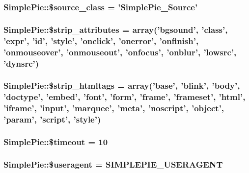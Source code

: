 \hypertarget{class_simple_pie_a8c05b90566d16d335054ed292cbe1de2}{
\subsubsection[{\$source\-\_\-class}]{\setlength{\rightskip}{0pt plus 5cm}Simple\-Pie\-::\$source\-\_\-class = '{\bf Simple\-Pie\-\_\-\-Source}'}}\label{class_simple_pie_a8c05b90566d16d335054ed292cbe1de2}
\hypertarget{class_simple_pie_af9901feeacfb99c20f9350a5d06a618f}{
\subsubsection[{\$strip\-\_\-attributes}]{\setlength{\rightskip}{0pt plus 5cm}Simple\-Pie\-::\$strip\-\_\-attributes = array('bgsound', 'class', 'expr', 'id', 'style', 'onclick', 'onerror', 'onfinish', 'onmouseover', 'onmouseout', 'onfocus', 'onblur', 'lowsrc', 'dynsrc')}}\label{class_simple_pie_af9901feeacfb99c20f9350a5d06a618f}
\hypertarget{class_simple_pie_a21a4745bf8bd70abba7f6fd9352cecbd}{
\subsubsection[{\$strip\-\_\-htmltags}]{\setlength{\rightskip}{0pt plus 5cm}Simple\-Pie\-::\$strip\-\_\-htmltags = array('base', 'blink', 'body', 'doctype', 'embed', 'font', 'form', 'frame', 'frameset', 'html', 'iframe', 'input', 'marquee', 'meta', 'noscript', 'object', 'param', 'script', 'style')}}\label{class_simple_pie_a21a4745bf8bd70abba7f6fd9352cecbd}
\hypertarget{class_simple_pie_a91f3b8c4a288715f41fff05e23c221ff}{
\subsubsection[{\$timeout}]{\setlength{\rightskip}{0pt plus 5cm}Simple\-Pie\-::\$timeout = 10}}\label{class_simple_pie_a91f3b8c4a288715f41fff05e23c221ff}
\hypertarget{class_simple_pie_ac5d98675096aaa26750b64d4ff22c721}{
\subsubsection[{\$useragent}]{\setlength{\rightskip}{0pt plus 5cm}Simple\-Pie\-::\$useragent = {\bf S\-I\-M\-P\-L\-E\-P\-I\-E\-\_\-\-U\-S\-E\-R\-A\-G\-E\-N\-T}}}\label{class_simple_pie_ac5d98675096aaa26750b64d4ff22c721}
